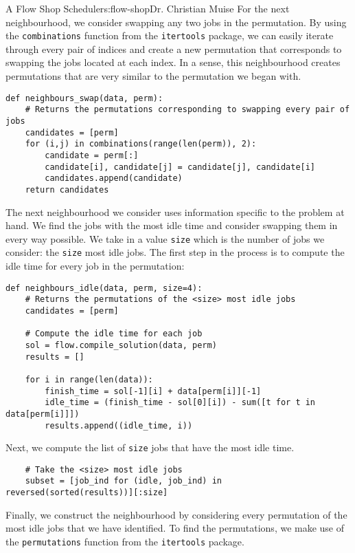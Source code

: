 \begin{aosachapter}{A Flow Shop Scheduler}{s:flow-shop}{Dr. Christian Muise}
For the next neighbourhood, we consider swapping any two jobs in the
permutation. By using the \texttt{combinations} function from the
\texttt{itertools} package, we can easily iterate through every pair of
indices and create a new permutation that corresponds to swapping the
jobs located at each index. In a sense, this neighbourhood creates
permutations that are very similar to the permutation we began with.

\begin{verbatim}
def neighbours_swap(data, perm):
    # Returns the permutations corresponding to swapping every pair of jobs
    candidates = [perm]
    for (i,j) in combinations(range(len(perm)), 2):
        candidate = perm[:]
        candidate[i], candidate[j] = candidate[j], candidate[i]
        candidates.append(candidate)
    return candidates
\end{verbatim}

The next neighbourhood we consider uses information specific to the
problem at hand. We find the jobs with the most idle time and consider
swapping them in every way possible. We take in a value \texttt{size}
which is the number of jobs we consider: the \texttt{size} most idle
jobs. The first step in the process is to compute the idle time for
every job in the permutation:

\begin{verbatim}
def neighbours_idle(data, perm, size=4):
    # Returns the permutations of the <size> most idle jobs
    candidates = [perm]

    # Compute the idle time for each job
    sol = flow.compile_solution(data, perm)
    results = []

    for i in range(len(data)):
        finish_time = sol[-1][i] + data[perm[i]][-1]
        idle_time = (finish_time - sol[0][i]) - sum([t for t in data[perm[i]]])
        results.append((idle_time, i))
\end{verbatim}

Next, we compute the list of \texttt{size} jobs that have the most idle
time.

\begin{verbatim}
    # Take the <size> most idle jobs
    subset = [job_ind for (idle, job_ind) in reversed(sorted(results))][:size]
\end{verbatim}

Finally, we construct the neighbourhood by considering every permutation
of the most idle jobs that we have identified. To find the permutations,
we make use of the \texttt{permutations} function from the
\texttt{itertools} package.


\end{aosachapter}
